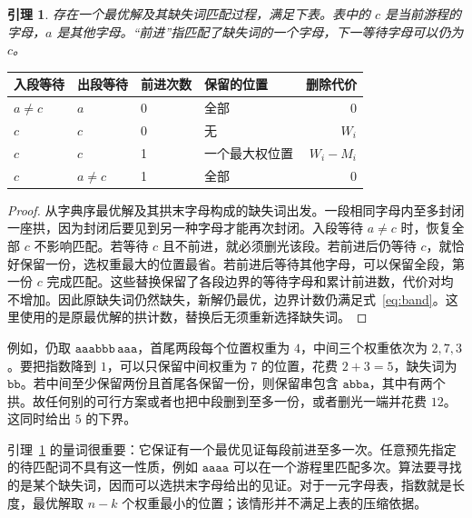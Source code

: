 \documentclass[UTF8,11pt,a4paper,fontset=fandol]{ctexart}
\theoremstyle{zh}
\newtheorem{lemma}[theorem]{引理}
\begin{document}
\begin{lemma}\label{lem:normal}
存在一个最优解及其缺失词匹配过程，满足下表。表中的 $c$ 是当前游程的字母，$a$ 是其他字母。“前进”指匹配了缺失词的一个字母，下一等待字母可以仍为 $c$。
\end{lemma}
\begin{center}
\begin{tabular}{@{}llllr@{}}
\toprule
入段等待 & 出段等待 & 前进次数 & 保留的位置 & 删除代价\\
\midrule
$a\ne c$ & $a$ & 0 & 全部 & $0$\\
$c$ & $c$ & 0 & 无 & $W_i$\\
$c$ & $c$ & 1 & 一个最大权位置 & $W_i-M_i$\\
$c$ & $a\ne c$ & 1 & 全部 & $0$\\
\bottomrule
\end{tabular}
\end{center}
\begin{proof}
从字典序最优解及其拱末字母构成的缺失词出发。一段相同字母内至多封闭一座拱，因为封闭后要见到另一种字母才能再次封闭。入段等待 $a\ne c$ 时，恢复全部 $c$ 不影响匹配。若等待 $c$ 且不前进，就必须删光该段。若前进后仍等待 $c$，就恰好保留一份，选权重最大的位置最省。若前进后等待其他字母，可以保留全段，第一份 $c$ 完成匹配。这些替换保留了各段边界的等待字母和累计前进数，代价对均不增加。因此原缺失词仍然缺失，新解仍最优，边界计数仍满足式~\eqref{eq:band}。这里使用的是原最优解的拱计数，替换后无须重新选择缺失词。
\end{proof}

例如，仍取 $\mathtt{aaabbb\,aaa}$，首尾两段每个位置权重为 $4$，中间三个权重依次为 $2,7,3$。要把指数降到 $1$，可以只保留中间权重为 $7$ 的位置，花费 $2+3=5$，缺失词为 $\mathtt{bb}$。若中间至少保留两份且首尾各保留一份，则保留串包含 $\mathtt{abba}$，其中有两个拱。故任何别的可行方案或者也把中段删到至多一份，或者删光一端并花费 $12$。这同时给出 $5$ 的下界。

引理~\ref{lem:normal} 的量词很重要：它保证有一个最优见证每段前进至多一次。任意预先指定的待匹配词不具有这一性质，例如 $\mathtt{aaaa}$ 可以在一个游程里匹配多次。算法要寻找的是某个缺失词，因而可以选拱末字母给出的见证。对于一元字母表，指数就是长度，最优解取 $n-k$ 个权重最小的位置；该情形并不满足上表的压缩依据。
\end{document}
